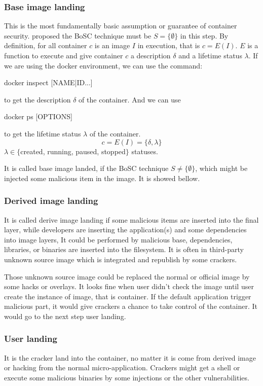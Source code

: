 \subsubsection{Base image landing}
This is the most fundamentally basic assumption or guarantee of container security.
\textcite{inproceedings} proposed the BoSC technique must be $S = \{\emptyset\}$ in this step. By definition, for all
container $c$ is an image $I$ in execution, that is  $c = E(I)$. $E$ is a function to execute and
give container $c$ a description $\delta$ and a lifetime status $\lambda$. If we are using the docker environment, we can use the command:
\begin{codebash}
    docker inspect [NAME|ID...]
\end{codebash}
to get the description $\delta$ of the container. And we can use
\begin{codebash}
    docker ps [OPTIONS]
\end{codebash}
to get the lifetime status $\lambda$ of the container.
$$c=E(I)=\{\delta, \lambda\}$$
$\lambda \in \{$created, running, paused, stopped$\}$ statuses.


It is called base image landed, if the BoSC technique $S \neq \{\emptyset\}$, which
might be injected some malicious item in the image. It is showed bellow.


\subsubsection{Derived image landing}
It is called derive image landing if some malicious items are inserted into the final layer,
while developers are inserting the application(s) and some dependencies into image layers,
It could be performed by malicious base, dependencies, libraries, or binaries are inserted
into the filesystem. It is often in third-party unknown source image which is integrated
and republish by some crackers.

Those unknown source image could be replaced the normal or official image by some hacks or overlays.
It looks fine when user didn't check the image until user create the instance of image, that is container.
If the default application trigger malicious part, it would give crackers a chance to take control of
the container. It would go to the next step user landing.

\subsubsection{User landing}
It is the cracker land into the container, no matter it is come from derived image or hacking from
the normal micro-application. Crackers might get a shell or execute some malicious binaries by
some injections or the other vulnerabilities.

